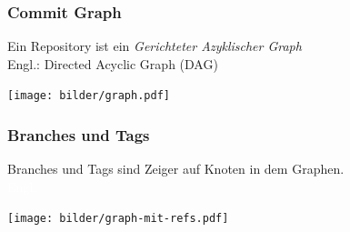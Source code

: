 \documentclass{beamer}
\begin{document}
\begin{frame}
 \frametitle{Commit Graph}



Ein Repository ist ein \emph{Gerichteter Azyklischer Graph}\\
Engl.: Directed Acyclic Graph (DAG)

\begin{center}
\texttt{[image: bilder/graph.pdf]}
\end{center}


 \end{frame}
\begin{frame}
 \frametitle{Branches und Tags}



Branches und Tags sind Zeiger auf Knoten in dem Graphen.\\
\textcolor{white}{Engl.}

\begin{center}
\texttt{[image: bilder/graph-mit-refs.pdf]}
\end{center}


 \end{frame}
\end{document}
